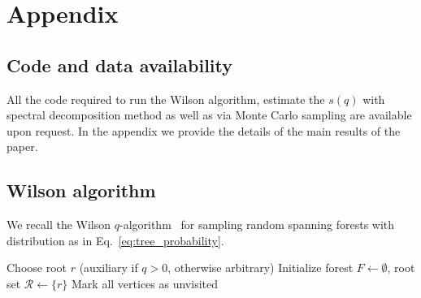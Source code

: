 \documentclass[10pt,aps,pre,twocolumn,nofootinbib,superscriptaddress,longbibliography]{revtex4-2}
\begin{document}
\appendix
\section{Appendix}
\subsection{Code and data availability}
All the code required to run the Wilson algorithm, estimate the $s(q)$ with spectral decomposition method as well as via Monte Carlo sampling are available upon request.
In the appendix we provide the details of the main results of the paper.
\subsection{Wilson algorithm}
We recall the Wilson $q$-algorithm~\cite{avena2018a,propp1998} for sampling random spanning forests with distribution as in Eq.~\ref{eq:tree_probability}.

\begin{algorithm}[htb]
\SetAlgoLined
\DontPrintSemicolon
{}

\BlankLine
{}
Choose root $r$ (auxiliary if $q>0$, otherwise arbitrary)\;
Initialize forest $F \leftarrow \emptyset$, root set $\mathcal{R} \leftarrow \{r\}$\;
Mark all vertices as unvisited\;

\BlankLine
{}

\BlankLine
{}
\caption{Random Rooted Forest Sampling (Wilson $q$-algorithm)}
\label{alg:wilson}
\end{algorithm}
\end{document}
